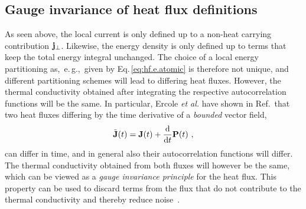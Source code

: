 \subsection{Gauge invariance of heat flux definitions}
As seen above, the local current is only defined up to a non-heat carrying contribution ${\bf j}_{\perp}$. Likewise, the energy density is only defined up to terms that keep the total energy integral unchanged. The choice of a local energy partitioning as,~e.\,g.,~given by Eq.\,\eqref{eq:hf.e.atomic} is therefore not unique, and different partitioning schemes will lead to differing heat fluxes. However, the thermal conductivity obtained after integrating the respective autocorrelation functions will be the same. In particular, Ercole \emph{et al.} have shown in Ref.\,\cite{Ercole2016} that two heat fluxes differing by the time derivative of a \emph{bounded} vector field,
\begin{align}
  \tilde{{\bf J}} (t) = {\bf J} (t) + \frac{{\rm d}}{{\rm d} t} {\bf P} (t)~,
\end{align}
can differ in time, and in general also their autocorrelation functions will differ. The thermal conductivity obtained from both fluxes will however be the same, which can be viewed as a \emph{gauge invariance principle} for the heat flux. This property can be used to discard terms from the flux that do not contribute to the thermal conductivity and thereby reduce noise~\cite{Marcolongo2020}. 

